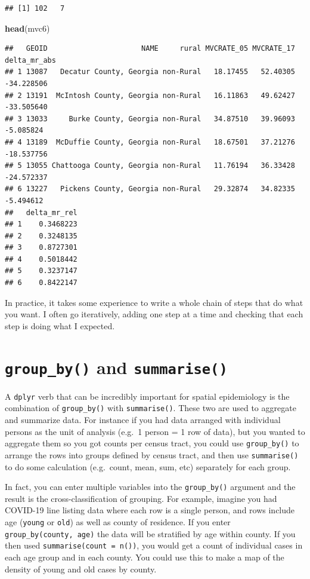 \documentclass[
]{book}
\newenvironment{Shaded}{\begin{snugshade}}{\end{snugshade}}
\newcommand{\FunctionTok}[1]{\textcolor[rgb]{0.13,0.29,0.53}{\textbf{#1}}}
\newcommand{\NormalTok}[1]{#1}
\begin{document}
\begin{verbatim}
## [1] 102   7
\end{verbatim}

\begin{Shaded}
\begin{Highlighting}[]
\FunctionTok{head}\NormalTok{(mvc6)}
\end{Highlighting}
\end{Shaded}

\begin{verbatim}
##   GEOID                      NAME     rural MVCRATE_05 MVCRATE_17 delta_mr_abs
## 1 13087   Decatur County, Georgia non-Rural   18.17455   52.40305   -34.228506
## 2 13191  McIntosh County, Georgia non-Rural   16.11863   49.62427   -33.505640
## 3 13033     Burke County, Georgia non-Rural   34.87510   39.96093    -5.085824
## 4 13189  McDuffie County, Georgia non-Rural   18.67501   37.21276   -18.537756
## 5 13055 Chattooga County, Georgia non-Rural   11.76194   36.33428   -24.572337
## 6 13227   Pickens County, Georgia non-Rural   29.32874   34.82335    -5.494612
##   delta_mr_rel
## 1    0.3468223
## 2    0.3248135
## 3    0.8727301
## 4    0.5018442
## 5    0.3237147
## 6    0.8422147
\end{verbatim}

In practice, it takes some experience to write a whole chain of steps that do what you want. I often go iteratively, adding one step at a time and checking that each step is doing what I expected.

\hypertarget{group_by-and-summarise}{%
\section{\texorpdfstring{\texttt{group\_by()} and \texttt{summarise()}}{group\_by() and summarise()}}\label{group_by-and-summarise}}

A \texttt{dplyr} verb that can be incredibly important for spatial epidemiology is the combination of \texttt{group\_by()} with \texttt{summarise()}. These two are used to aggregate and summarize data. For instance if you had data arranged with individual persons as the unit of analysis (e.g.~1 person = 1 row of data), but you wanted to aggregate them so you got counts per census tract, you could use \texttt{group\_by()} to arrange the rows into groups defined by census tract, and then use \texttt{summarise()} to do some calculation (e.g.~count, mean, sum, etc) separately for each group.

In fact, you can enter multiple variables into the \texttt{group\_by()} argument and the result is the cross-classification of grouping. For example, imagine you had COVID-19 line listing data where each row is a single person, and rows include age (\texttt{young} or \texttt{old}) as well as county of residence. If you enter \texttt{group\_by(county,\ age)} the data will be stratified by age within county. If you then used \texttt{summarise(count\ =\ n())}, you would get a count of individual cases in each age group and in each county. You could use this to make a map of the density of young and old cases by county.
\end{document}
